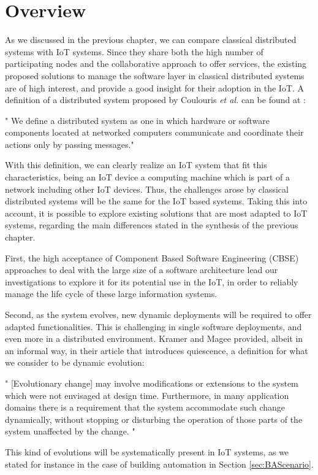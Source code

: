 \section{Overview}
\label{sec:DSOverview}
As we discussed in the previous chapter, we can compare classical distributed systems with IoT systems.
Since they share both the high number of participating nodes and the collaborative approach to offer services, the existing proposed solutions to manage the software layer in classical distributed systems are of high interest, and provide a good insight for their adoption in the IoT.
A definition of a distributed system proposed by Coulouris \textit{et al.} can be found at \cite{coulouris2005distributed}:
\begin{citeverbatim}
	" We define a distributed system as one in which hardware or software components located at networked computers communicate and coordinate their actions only by passing messages."
\end{citeverbatim}
With this definition, we can clearly realize an IoT system that fit this characteristics, being an IoT device a computing machine which is part of a network including other IoT devices.
Thus, the challenges arose by classical distributed systems will be the same for the IoT based systems.
Taking this into account, it is possible to explore existing solutions that are most adapted to IoT systems, regarding the main differences stated in the synthesis of the previous chapter.

First, the high acceptance of Component Based Software Engineering (CBSE)\cite{crnkovic2002building} approaches to deal with the large size of a software architecture lead our investigations to explore it for its potential use in the IoT, in order to reliably manage the life cycle of these large information systems.

Second, as the system evolves, new dynamic deployments will be required to offer adapted functionalities.
This is challenging in single software deployments, and even more in a distributed environment.
Kramer and Magee\cite{kramer1990evolving} provided, albeit in an informal way, in their article that introduces quiescence, a definition for what we consider to be dynamic evolution:
\begin{citeverbatim}
	" [Evolutionary change] may involve modifications or extensions to the system which were not envisaged at design time.
	Furthermore, in many application domains there is a requirement that the system accommodate such change dynamically, without stopping or disturbing the operation of those parts of the system unaffected by the change. "
\end{citeverbatim}
This kind of evolutions will be systematically present in IoT systems, as we stated for instance in the case of building automation in Section \ref{sec:BAScenario}.

